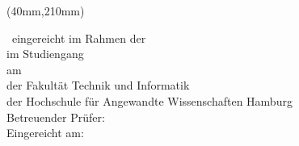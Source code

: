 %
%
\title{\IthesisTitle}   %
\author{\IthesisAuthor} %

\newpage
\thispagestyle{empty}
{\selectfont
  \hfuzz=20pt       %

  \vspace*{1cm}
  \begin{minipage}[b]{\textwidth}
    \fontsize{14pt}{20pt}
    \selectfont
    \begin{center}
      \IthesisAuthor
    \end{center}
  \end{minipage}

  \vspace{1.5cm}
  \begin{minipage}[b][0cm][t]{\textwidth}
    \fontsize{18pt}{20pt}
    \selectfont
    \begin{center}
      \IthesisTitle
    \end{center}
  \end{minipage}

  \begin{textblock*}{\textwidth}(40mm,210mm)
    \begin{minipage}[b]{\textwidth}
      \selectfont
      \fontsize{12pt}{14pt}
      \selectfont
      \IthesisKindDE ~eingereicht im Rahmen der \IthesisExaminationDE \\
      im Studiengang \textit{\IstudyCourseName} \\
      am \IthesisDepartmentFull \\
      der Fakultät Technik und Informatik\\
      der Hochschule für Angewandte Wissenschaften Hamburg\\

      Betreuender Prüfer: \IfirstSv \\

      Eingereicht am: \ISubDate \\
    \end{minipage}
  \end{textblock*}
}
